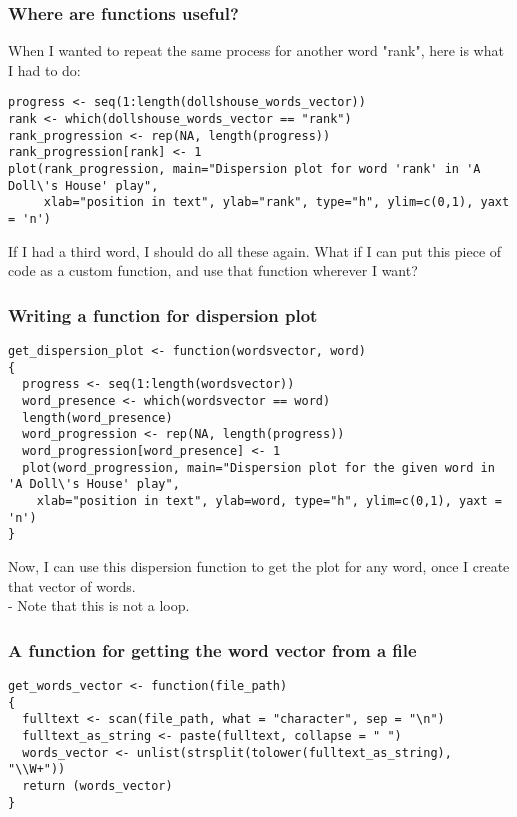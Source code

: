 \documentclass{beamer}
\begin{document}
\begin{frame}[fragile]
\frametitle{Where are functions useful?}
When I wanted to repeat the same process for another word "rank", here is what I had to do:
\tiny
\begin{verbatim}
progress <- seq(1:length(dollshouse_words_vector))
rank <- which(dollshouse_words_vector == "rank")
rank_progression <- rep(NA, length(progress))
rank_progression[rank] <- 1
plot(rank_progression, main="Dispersion plot for word 'rank' in 'A Doll\'s House' play",
     xlab="position in text", ylab="rank", type="h", ylim=c(0,1), yaxt = 'n')
\end{verbatim}
\normalsize
If I had a third word, I should do all these again. What if I can put this piece of code as a custom function, and use that function wherever I want?
\end{frame}

\begin{frame}[fragile]
\frametitle{Writing a function for dispersion plot}
\tiny
\begin{verbatim}
get_dispersion_plot <- function(wordsvector, word)
{
  progress <- seq(1:length(wordsvector))
  word_presence <- which(wordsvector == word)
  length(word_presence)
  word_progression <- rep(NA, length(progress))
  word_progression[word_presence] <- 1
  plot(word_progression, main="Dispersion plot for the given word in 'A Doll\'s House' play",
    xlab="position in text", ylab=word, type="h", ylim=c(0,1), yaxt = 'n')
}
\end{verbatim}
\normalsize Now, I can use this dispersion function to get the plot for any word, once I create that vector of words. 
\\- Note that this is not a loop. 
\end{frame}

\begin{frame}[fragile]
\frametitle{A function for getting the word vector from a file}
\tiny
\begin{verbatim}
get_words_vector <- function(file_path)
{
  fulltext <- scan(file_path, what = "character", sep = "\n")
  fulltext_as_string <- paste(fulltext, collapse = " ")
  words_vector <- unlist(strsplit(tolower(fulltext_as_string), "\\W+"))
  return (words_vector)
}
\end{verbatim}
\end{frame}
\end{document}
